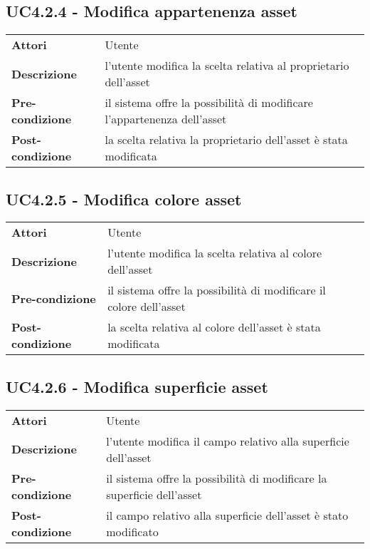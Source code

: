 \subsection{UC4.2.4 - Modifica appartenenza asset}
\label{sssec:UC4.2.4}
\def\arraystretch{1.5}
\begin{tabularx}{\textwidth}{l|p{}}
\rowcolor{I} \multicolumn{2}{c}{\color{white}\textbf{UC4.2.4 - Modifica appartenenza asset}} \\
\toprule
\endhead
\textbf{Attori} & Utente\\
\textbf{Descrizione} & l'utente modifica la scelta relativa al proprietario dell'asset\\
\textbf{Pre-condizione} & il sistema offre la possibilità di modificare l'appartenenza dell'asset\\
\textbf{Post-condizione} & la scelta relativa la proprietario dell'asset è stata modificata\\
\bottomrule
\end{tabularx}
\subsection{UC4.2.5 - Modifica colore asset}
\label{sssec:UC4.2.5}
\def\arraystretch{1.5}
\begin{tabularx}{\textwidth}{l|p{}}
\rowcolor{I} \multicolumn{2}{c}{\color{white}\textbf{UC4.2.5 - Modifica colore asset}} \\
\toprule
\endhead
\textbf{Attori} & Utente\\
\textbf{Descrizione} & l'utente modifica la scelta relativa al colore dell'asset\\
\textbf{Pre-condizione} & il sistema offre la possibilità di modificare il colore dell'asset\\
\textbf{Post-condizione} & la scelta relativa al colore dell'asset è stata modificata\\
\bottomrule
\end{tabularx}
\subsection{UC4.2.6 - Modifica superficie asset}
\label{sssec:UC4.2.6}
\def\arraystretch{1.5}
\begin{tabularx}{\textwidth}{l|p{}}
\rowcolor{I} \multicolumn{2}{c}{\color{white}\textbf{UC4.2.6 - Modifica superficie asset}} \\
\toprule
\endhead
\textbf{Attori} & Utente\\
\textbf{Descrizione} & l'utente modifica il campo relativo alla superficie dell'asset\\
\textbf{Pre-condizione} & il sistema offre la possibilità di modificare la superficie dell'asset\\
\textbf{Post-condizione} & il campo relativo alla superficie dell'asset è stato modificato\\
\bottomrule
\end{tabularx}
